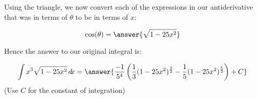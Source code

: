\documentclass{ximera}
\begin{document}
\begin{exercise}
\begin{exercise}
\begin{exercise}
Using the triangle, we now convert each of the expressions in our antiderivative that was in terms of $\theta$ to be in terms of $x$:

\[
\cos(\theta)=\answer{\sqrt{1-25x^{2}}}
\]

\begin{exercise}
Hence the answer to our original integral is: 

\[
\int x^{3} \sqrt{1-25x^{2}}  \d x= \answer{ \frac{-1}{5^{4}} \left( \frac{1}{3}(1-25x^{2})^{\frac{3}{2}} - \frac{1}{5}(1-25x^{2})^{\frac{5}{2}}\right) + C }
\]
(Use $C$ for the constant of integration)





\end{exercise}
\end{exercise}

\end{exercise}

\end{exercise}
\end{document}
